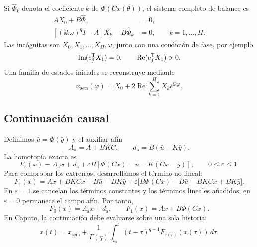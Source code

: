 Si \(\widehat\Phi_k\) denota el coeficiente \(k\) de \(\Phi(Cx(\theta))\), el
sistema completo de balance es
\begin{align}
 AX_0+B\widehat\Phi_0&=0,
 \label{nc:eq:hb0}\\
 \left[(\ii k\omega)^qI-A\right]X_k-B\widehat\Phi_k&=0,
 \qquad k=1,\ldots,H.
 \label{nc:eq:hbk}
\end{align}
Las incógnitas son \(X_0,X_1,\ldots,X_H,\omega\), junto con una condición de
fase, por ejemplo
\begin{equation}
 \operatorname{Im}(e_j^{\mathsf T} X_1)=0,\qquad
 \operatorname{Re}(e_j^{\mathsf T} X_1)>0.
 \label{nc:eq:phase-condition}
\end{equation}
Una familia de estados iniciales se reconstruye mediante
\begin{equation}
 x_{\mathrm{sem}}(\varphi)=X_0+
 2\operatorname{Re}\sum_{k=1}^{H}X_ke^{\ii k\varphi}.
 \label{nc:eq:seed-reconstruction}
\end{equation}

\subsection{Continuación causal}

Definimos \(\bar u=\Phi(\bar y)\) y el auxiliar afín
\begin{equation}
 A_{\mathrm a}=A+BKC,\qquad
 d_{\mathrm a}=B(\bar u-K\bar y).
 \label{nc:eq:auxiliary}
\end{equation}
La homotopía exacta es
\begin{equation}
 F_\varepsilon(x)=A_{\mathrm a}x+d_{\mathrm a}
 +\varepsilon B\left[
 \Phi(Cx)-\bar u-K(Cx-\bar y)
 \right],\qquad 0\leq\varepsilon\leq1.
 \label{nc:eq:homotopy}
\end{equation}
Para comprobar los extremos, desarrollamos el término no lineal:
\[
 F_\varepsilon(x)=Ax+BKCx+B\bar u-BK\bar y
 +\varepsilon\bigl[B\Phi(Cx)-B\bar u-BKCx+BK\bar y\bigr].
\]
En \(\varepsilon=1\) se cancelan los términos constantes y los términos
lineales añadidos; en \(\varepsilon=0\) permanece el campo afín. Por tanto,
\begin{equation}
 F_0(x)=A_{\mathrm a}x+d_{\mathrm a},
 \qquad F_1(x)=Ax+B\Phi(Cx).
\end{equation}
En Caputo, la continuación debe evaluarse sobre una sola historia:
\begin{equation}
 x(t)=x_{\mathrm{sem}}+
 \frac{1}{\Gamma(q)}\int_{t_0}^{t}
 (t-\tau)^{q-1}F_{\varepsilon(\tau)}(x(\tau))\,d\tau.
 \label{nc:eq:causal-homotopy}
\end{equation}

